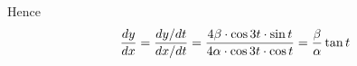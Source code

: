 \documentclass[14pt,fleqn]{extarticle}
\begin{document}
\begin{problem}
\begin{step}
Hence \[ \frac{dy}{dx} = \frac{dy / dt}{dx / dt} = \frac{4\beta \cdot\cos 3t \cdot \sin t}{4\alpha\cdot\cos 3t\cdot \cos t} = \frac{\beta}{\alpha}\tan t\]
\end{step}
\end{problem} 
\end{document}

